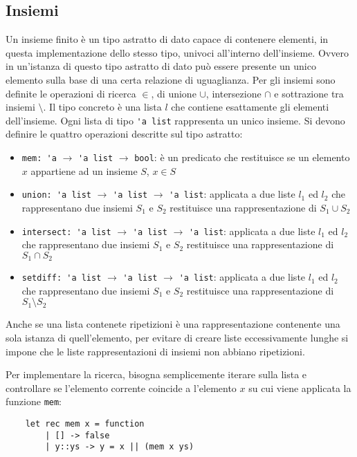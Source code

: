 \documentclass{article}
\numberwithin{equation}{subsection}
\begin{document}
\subsection{Insiemi}

Un insieme finito è un tipo astratto di dato capace di contenere elementi, in questa implementazione dello stesso tipo, univoci all'interno dell'insieme. Ovvero in un'istanza di questo tipo astratto di dato può essere presente un unico elemento sulla base di una certa relazione di uguaglianza. 
Per gli insiemi sono definite le operazioni di ricerca $\in$, di unione $\cup$, intersezione $\cap$ e sottrazione tra insiemi $\setminus$. Il tipo concreto è una lista $l$ che contiene esattamente gli elementi dell'insieme. Ogni lista di tipo \verb|'a list| rappresenta un unico insieme. Si devono definire le quattro operazioni descritte sul tipo astratto:
\begin{itemize}
    \item \verb|mem: 'a| $\rightarrow$ \verb|'a list| $\rightarrow$ \verb|bool|: è un predicato che restituisce se un elemento $x$ appartiene ad un insieme $S$, $x\in S$
    \item \verb|union: 'a list| $\rightarrow$ \verb|'a list| $\rightarrow$ \verb|'a list|: applicata a due liste $l_1$ ed $l_2$ che rappresentano due insiemi $S_1$ e $S_2$ restituisce una rappresentazione di $S_1\cup S_2$
    \item \verb|intersect: 'a list| $\rightarrow$ \verb|'a list| $\rightarrow$ \verb|'a list|: applicata a due liste $l_1$ ed $l_2$ che rappresentano due insiemi $S_1$ e $S_2$ restituisce una rappresentazione di $S_1\cap S_2$
    \item \verb|setdiff: 'a list| $\rightarrow$ \verb|'a list| $\rightarrow$ \verb|'a list|: applicata a due liste $l_1$ ed $l_2$ che rappresentano due insiemi $S_1$ e $S_2$ restituisce una rappresentazione di $S_1\setminus S_2$
\end{itemize}
Anche se una lista contenete ripetizioni è una rappresentazione contenente una sola istanza di quell'elemento, per evitare di creare liste eccessivamente lunghe si impone che le liste rappresentazioni di insiemi non abbiano ripetizioni. 

Per implementare la ricerca, bisogna semplicemente iterare sulla lista e controllare se l'elemento corrente coincide a l'elemento $x$ su cui viene applicata la funzione \verb|mem|:
\begin{verbatim}
    let rec mem x = function
        | [] -> false
        | y::ys -> y = x || (mem x ys)
\end{verbatim}
\end{document}
